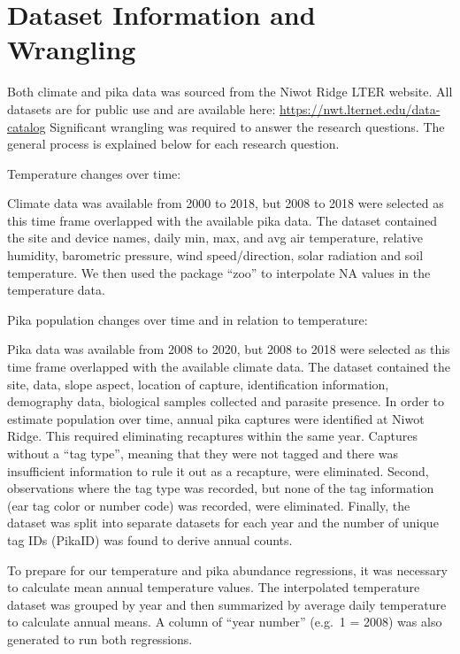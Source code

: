 \documentclass[
  12pt,
]{article}
\begin{document}
\newpage

\hypertarget{dataset-information-and-wrangling}{%
\section{Dataset Information and
Wrangling}\label{dataset-information-and-wrangling}}

Both climate and pika data was sourced from the Niwot Ridge LTER
website. All datasets are for public use and are available here:
\url{https://nwt.lternet.edu/data-catalog} Significant wrangling was
required to answer the research questions. The general process is
explained below for each research question.

Temperature changes over time:

Climate data was available from 2000 to 2018, but 2008 to 2018 were
selected as this time frame overlapped with the available pika data. The
dataset contained the site and device names, daily min, max, and avg air
temperature, relative humidity, barometric pressure, wind
speed/direction, solar radiation and soil temperature. We then used the
package ``zoo'' to interpolate NA values in the temperature data.

Pika population changes over time and in relation to temperature:

Pika data was available from 2008 to 2020, but 2008 to 2018 were
selected as this time frame overlapped with the available climate data.
The dataset contained the site, data, slope aspect, location of capture,
identification information, demography data, biological samples
collected and parasite presence. In order to estimate population over
time, annual pika captures were identified at Niwot Ridge. This required
eliminating recaptures within the same year. Captures without a ``tag
type'', meaning that they were not tagged and there was insufficient
information to rule it out as a recapture, were eliminated. Second,
observations where the tag type was recorded, but none of the tag
information (ear tag color or number code) was recorded, were
eliminated. Finally, the dataset was split into separate datasets for
each year and the number of unique tag IDs (PikaID) was found to derive
annual counts.

To prepare for our temperature and pika abundance regressions, it was
necessary to calculate mean annual temperature values. The interpolated
temperature dataset was grouped by year and then summarized by average
daily temperature to calculate annual means. A column of ``year number''
(e.g.~1 = 2008) was also generated to run both regressions.
\end{document}
